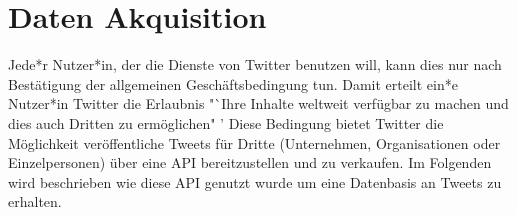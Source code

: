 \chapter{Daten Akquisition}
\label{chap:akquisition}
Jede*r Nutzer*in, der die Dienste von Twitter benutzen will, kann dies nur nach Bestätigung der allgemeinen Geschäftsbedingung tun. Damit erteilt ein*e Nutzer*in Twitter die Erlaubnis "`Ihre Inhalte weltweit verfügbar zu machen und dies auch Dritten zu ermöglichen" '\cite[Absatz 3]{twitter-agb}
Diese Bedingung bietet Twitter die Möglichkeit veröffentliche Tweets für Dritte (Unternehmen, Organisationen oder Einzelpersonen) über eine \ac{API} bereitzustellen und zu verkaufen. Im Folgenden wird beschrieben wie diese \ac{API} genutzt wurde um eine Datenbasis an Tweets zu erhalten.\\

